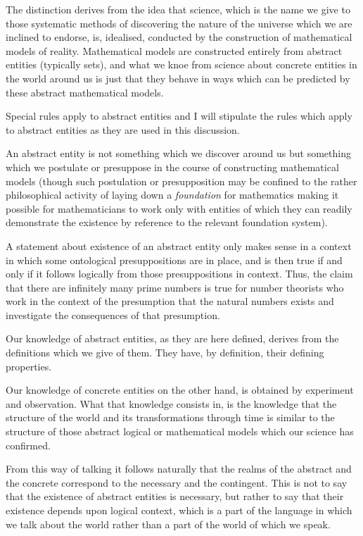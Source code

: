 \documentclass{rbjk}
\begin{document}
\begin{article}
The distinction derives from the idea that science, which is the name we give to those systematic methods of discovering the nature of the universe which we are inclined to endorse, is, idealised, conducted by the construction of mathematical models of reality.
Mathematical models are constructed entirely from abstract entities (typically sets), and what we knoe from science about concrete entities in the world around us is just that they behave in ways which can be predicted by these abstract mathematical models. 

Special rules apply to abstract entities and I will stipulate the rules which apply to abstract entities as they are used in this discussion.

An abstract entity is not something which we discover around us but something which we postulate or presuppose in the course of constructing mathematical models (though such postulation or presupposition may be confined to the rather philosophical activity of laying down a {\it foundation} for mathematics making it possible for mathematicians to work only with entities of which they can readily demonstrate the existence by reference to the relevant foundation system).

A statement about existence of an abstract entity only makes sense in a context in which some ontological presuppositions are in place, and is then true if and only if it follows logically from those presuppositions in context.
Thus, the claim that there are infinitely many prime numbers is true for number theorists who work in the context of the presumption that the natural numbers exists and investigate the consequences of that presumption.

Our knowledge of abstract entities, as they are here defined, derives from the definitions which we give of them.
They have, by definition, their defining properties.

Our knowledge of concrete entities on the other hand, is obtained by experiment and observation.
What that knowledge consists in, is the knowledge that the structure of the world and its transformations through time is similar to the structure of those abstract logical or mathematical models which our science has confirmed.

From this way of talking it follows naturally that the realms of the abstract and the concrete correspond to the necessary and the contingent.
This is not to say that the existence of abstract entities is necessary, but rather to say that their existence depends upon logical context, which is a part of the language in which we talk about the world rather than a part of the world of which we speak.


\end{article}
\end{document}
